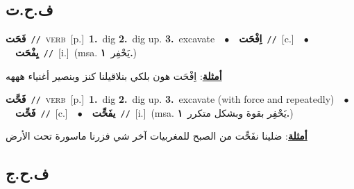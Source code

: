 \documentclass[10pt,a4paper,twoside]{article} %
\begin{document}
\begin{multicols}{2}
\vspace{-3mm}
\subsection*{\color{blue}\foreignlanguage{arabic}{ف.ح.ت}\color{blue}{}} 

{\setlength\topsep{0pt}\textbf{\foreignlanguage{arabic}{فَحَت}}\ {\color{gray}\texttt{//}\color{black}}\ \textsc{verb}\ [p.]\ \textbf{1.}~dig  \textbf{2.}~dig up.  \textbf{3.}~excavate\ \ $\bullet$\ \ \setlength\topsep{0pt}\textbf{\foreignlanguage{arabic}{اِفْحَت}}\ {\color{gray}\texttt{//}\color{black}}\ [c.]\ \ $\bullet$\ \ \setlength\topsep{0pt}\textbf{\foreignlanguage{arabic}{يِفْحَت}}\ {\color{gray}\texttt{//}\color{black}}\ [i.]\ \color{gray}(msa. \foreignlanguage{arabic}{يَحْفِر}~\foreignlanguage{arabic}{\textbf{١.}})\color{black}\  \begin{flushright}\color{gray}\foreignlanguage{arabic}{\textbf{\underline{\foreignlanguage{arabic}{أمثلة}}}: اِفْحَت هون بلكي بنلاقيلنا كنز وبنصير أغنياء هههه}\end{flushright}\color{black}} \vspace{2mm}

{\setlength\topsep{0pt}\textbf{\foreignlanguage{arabic}{فَحَّت}}\ {\color{gray}\texttt{//}\color{black}}\ \textsc{verb}\ [p.]\ \textbf{1.}~dig  \textbf{2.}~dig up.  \textbf{3.}~excavate (with force and repeatedly)\ \ $\bullet$\ \ \setlength\topsep{0pt}\textbf{\foreignlanguage{arabic}{فَحِّت}}\ {\color{gray}\texttt{//}\color{black}}\ [c.]\ \ $\bullet$\ \ \setlength\topsep{0pt}\textbf{\foreignlanguage{arabic}{يفَحِّت}}\ {\color{gray}\texttt{//}\color{black}}\ [i.]\ \color{gray}(msa. \foreignlanguage{arabic}{يَحْفِر بقوة وبشكل متكرر}~\foreignlanguage{arabic}{\textbf{١.}})\color{black}\  \begin{flushright}\color{gray}\foreignlanguage{arabic}{\textbf{\underline{\foreignlanguage{arabic}{أمثلة}}}: ضلينا نفَحِّت من الصبح للمغربيات آخر شي فزرنا ماسورة تحت الأرض}\end{flushright}\color{black}} \vspace{2mm}

\vspace{-3mm}
\subsection*{\color{blue}\foreignlanguage{arabic}{ف.ح.ج}\color{blue}{}} 


\end{multicols}
\end{document}
